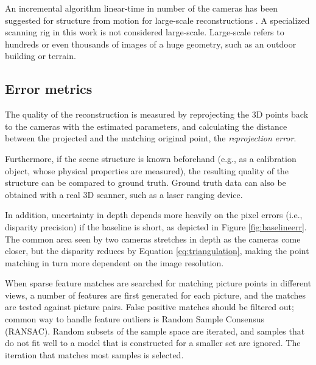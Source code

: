 An incremental algorithm linear-time in number of the cameras has been suggested for structure from motion for large-scale reconstructions \cite{wu2013towards}.
A specialized scanning rig in this work is not considered large-scale.
Large-scale refers to hundreds or even thousands of images of a huge geometry, such as an outdoor building or terrain.


\subsection{Error metrics} %

The quality of the reconstruction is measured by reprojecting the 3D points back to the cameras with the estimated parameters, and calculating the distance between the projected and the matching original point, the \emph{reprojection error}. \cite{hartley03multiview}

Furthermore, if the scene structure is known beforehand (e.g., as a calibration object, whose physical properties are measured), the resulting quality of the structure can be compared to ground truth.
Ground truth data can also be obtained with a real 3D scanner, such as a laser ranging device. %

In addition, uncertainty in depth depends more heavily on the pixel errors (i.e., disparity precision) if the baseline is short, as depicted in Figure \ref{fig:baselineerr}.
The common area seen by two cameras stretches in depth as the cameras come closer, but the disparity reduces by Equation \ref{eq:triangulation}, making the point matching in turn more dependent on the image resolution.


When sparse feature matches are searched for matching picture points in different views, a number of features are first generated for each picture, and the matches are tested against picture pairs.
False positive matches should be filtered out; common way to handle feature outliers is Random Sample Consensus (RANSAC).
Random subsets of the sample space are iterated, and samples that do not fit well to a model that is constructed for a smaller set are ignored.
The iteration that matches most samples is selected. \cite{hartley03multiview}

